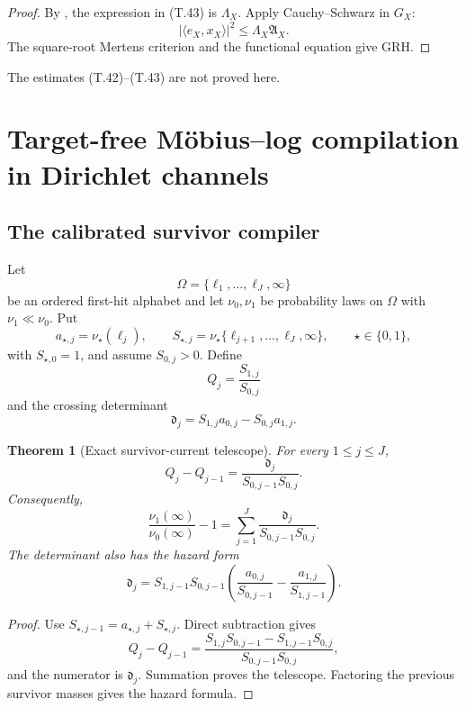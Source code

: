 \documentclass[11pt]{article}
\newtheorem{theorem}{Theorem}[section]
\theoremstyle{definition}
\theoremstyle{remark}
\begin{document}
\begin{proof}
By , the expression in
\textup{(T.43)} is \(\Lambda_X\).  Apply Cauchy--Schwarz in \(G_X\):
\[
 |\langle e_X,x_X\rangle|^2\le\Lambda_X\mathfrak A_X.
\]
The square-root Mertens criterion and the functional equation give GRH.
\end{proof}

The estimates \textup{(T.42)}--\textup{(T.43)} are not proved here.



\section{Target-free M\"obius--log compilation in Dirichlet channels}
\label{sec:grh-outer}

\subsection{The calibrated survivor compiler}
\label{subsec:grhouter-survivor-compiler}

Let
\[
 \Omega=\{\ell_1,\ldots,\ell_J,\infty\}
\]
be an ordered first-hit alphabet and let \(\nu_0,\nu_1\) be probability laws
on \(\Omega\) with \(\nu_1\ll\nu_0\).  Put
\[
 a_{\star,j}=\nu_\star(\ell_j),
 \qquad
 S_{\star,j}=\nu_\star\{\ell_{j+1},\ldots,\ell_J,\infty\},
 \qquad \star\in\{0,1\},
\]
with \(S_{\star,0}=1\), and assume \(S_{0,j}>0\).  Define
\[
 Q_j=\frac{S_{1,j}}{S_{0,j}}
\]
and the crossing determinant
\[
 \boxed{
 \mathfrak d_j=S_{1,j}a_{0,j}-S_{0,j}a_{1,j}.}
 \tag{G.2}
\]

\begin{theorem}[Exact survivor-current telescope]
\label{thm:grhouter-survivor-current}
For every \(1\le j\le J\),
\[
 \boxed{
 Q_j-Q_{j-1}
 =\frac{\mathfrak d_j}{S_{0,j-1}S_{0,j}}.}
 \tag{G.3}
\]
Consequently,
\[
 \boxed{
 \frac{\nu_1(\infty)}{\nu_0(\infty)}-1
 =\sum_{j=1}^{J}
   \frac{\mathfrak d_j}{S_{0,j-1}S_{0,j}}.}
 \tag{G.4}
\]
The determinant also has the hazard form
\[
 \boxed{
 \mathfrak d_j
 =S_{1,j-1}S_{0,j-1}
  \left(
   \frac{a_{0,j}}{S_{0,j-1}}
   -\frac{a_{1,j}}{S_{1,j-1}}
  \right).}
 \tag{G.5}
\]
\end{theorem}

\begin{proof}
Use \(S_{\star,j-1}=a_{\star,j}+S_{\star,j}\).  Direct subtraction gives
\[
 Q_j-Q_{j-1}
 =\frac{S_{1,j}S_{0,j-1}-S_{1,j-1}S_{0,j}}
       {S_{0,j-1}S_{0,j}},
\]
and the numerator is \(\mathfrak d_j\).  Summation proves the telescope.
Factoring the previous survivor masses gives the hazard formula.
\end{proof}
\end{document}
